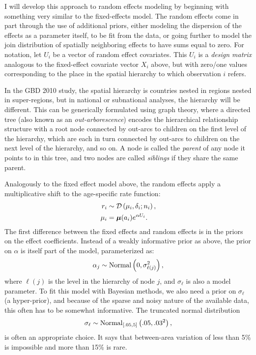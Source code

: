 I will develop this approach to random effects modeling by beginning
with something very similar to the fixed-effects model.  The random
effects come in part through the use of additional priors, either
modeling the dispersion of the effects as a parameter itself, to be
fit from the data, or going further to model the join distribution of
spatially neighboring effects to have sums equal to zero.  For
notation, let $U_i$ be a vector of random effect covariates.  This
$U_i$ is a \emph{design matrix} analogous to the fixed-effect
covariate vector $X_i$ above, but with zero/one values corresponding
to the place in the spatial hierarchy to which observation $i$ refers.

In the GBD 2010 study, the spatial hierarchy is countries nested in regions
nested in super-regions, but in national or subnational analyses, the
hierarchy will be different. This can be generically formulated using
graph theory, where a directed tree (also known as an
\emph{out-arborescence}) encodes the hierarchical relationship
structure with a root node connected by out-arcs to children on the
first level of the hierarchy, which are each in turn connected by
out-arcs to children on the next level of the hierarchy, and so on.  A
node is called the \emph{parent} of any node it points to in this
tree, and two nodes are called \emph{siblings} if they share the same
parent.


Analogously to the fixed effect model above, the random effects apply
a multiplicative shift to the age-specific rate function:
\begin{align*}
r_i &\sim \mathcal{D}\left(\mu_i, \delta_i; n_i\right),\\
\mu_i &= \boldsymbol{\mu}(a_i)e^{\alpha U_i}.
\end{align*}
The first difference between the fixed effects and random effects is
in the priors on the effect coefficients.  Instead of a weakly
informative prior as above, the prior on $\alpha$ is itself part of
the model, parameterized as:
\[
\alpha_j \sim \operatorname{Normal}\left(0, \sigma_{\ell(j)}^2\right),
\]
where $\ell(j)$ is the level in the hierarchy of node $j$, and
$\sigma_\ell$ is also a model parameter. To fit this model with
Bayesian methods, we also need a prior on $\sigma_\ell$ (a
hyper-prior), and because of the sparse and noisy nature of the
available data, this often has to be somewhat informative.  The
truncated normal distribution
\[
\sigma_\ell \sim \operatorname{Normal}_{[.05,5]}\left(.05, .03^2\right),
\]
is often an appropriate choice. It says that between-area variation of
less than 5\% is impossible and more than 15\% is rare.

